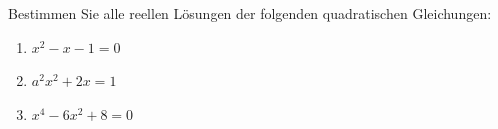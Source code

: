 \begin{ExerciseBlock}
Bestimmen Sie alle reellen Lösungen der folgenden quadratischen Gleichungen:
\begin{enumerate}[label=\alph*)]
	\item $\displaystyle x^2 - x -1 = 0$
	\item $\displaystyle a^2 x^2 + 2x = 1$
	\item $\displaystyle x^4-6x^2+8=0$	
\end{enumerate}

\end{ExerciseBlock}
